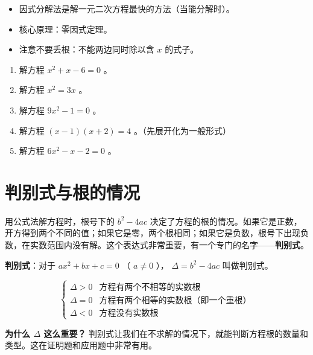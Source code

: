 \begin{keytakeaway}


\begin{itemize}
  \item 因式分解法是解一元二次方程最快的方法（当能分解时）。
  \item 核心原理：零因式定理。
  \item 注意不要丢根：不能两边同时除以含 $x$ 的式子。
\end{itemize}


\end{keytakeaway}

\begin{practice}


\begin{enumerate}
  \item 解方程 $x^2 + x - 6 = 0$ 。
  \item 解方程 $x^2 = 3x$ 。
  \item 解方程 $9x^2 - 1 = 0$ 。
  \item 解方程 $(x - 1)(x + 2) = 4$ 。（先展开化为一般形式）
  \item 解方程 $6x^2 - x - 2 = 0$ 。
\end{enumerate}


\end{practice}

\section*{判别式与根的情况}


\begin{explore}


用公式法解方程时，根号下的 $b^2 - 4ac$ 决定了方程的根的情况。如果它是正数，开方得到两个不同的值；如果它是零，两个根相同；如果它是负数，根号下出现负数，在实数范围内没有解。这个表达式非常重要，有一个专门的名字——\textbf{判别式}。

\end{explore}

\begin{understand}


\textbf{判别式}：对于 $ax^2 + bx + c = 0$ （ $a \neq 0$ ）， $\Delta = b^2 - 4ac$ 叫做判别式。

\[
\begin{cases}
\Delta > 0 & \text{方程有两个不相等的实数根} \\
\Delta = 0 & \text{方程有两个相等的实数根（即一个重根）} \\
\Delta < 0 & \text{方程没有实数根}
\end{cases}
\]


\textbf{为什么 $\Delta$ 这么重要？} 判别式让我们在不求解的情况下，就能判断方程根的数量和类型。这在证明题和应用题中非常有用。

\end{understand}

